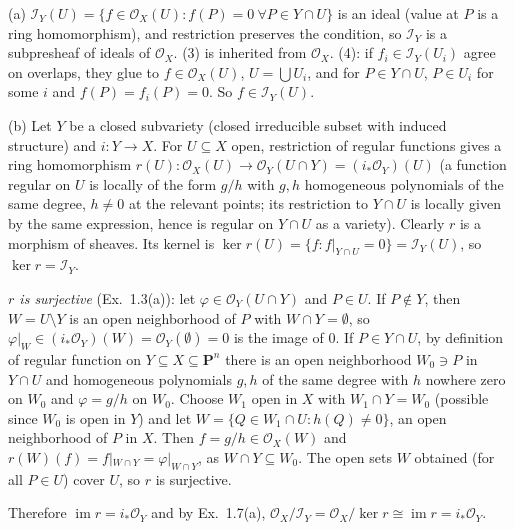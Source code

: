 \documentclass[11pt]{article}
\begin{document}
(a) $\mathcal I_Y(U)=\{f\in\mathcal O_X(U):f(P)=0\ \forall P\in Y\cap U\}$ is an ideal (value at $P$ is a ring homomorphism), and restriction preserves the condition, so $\mathcal I_Y$ is a subpresheaf of ideals of $\mathcal O_X$. (3) is inherited from $\mathcal O_X$. (4): if $f_i\in\mathcal I_Y(U_i)$ agree on overlaps, they glue to $f\in\mathcal O_X(U)$, $U=\bigcup U_i$, and for $P\in Y\cap U$, $P\in U_i$ for some $i$ and $f(P)=f_i(P)=0$. So $f\in\mathcal I_Y(U)$.

(b) Let $Y$ be a closed subvariety (closed irreducible subset with induced structure) and $i\colon Y\to X$. For $U\subseteq X$ open, restriction of regular functions gives a ring homomorphism $r(U)\colon\mathcal O_X(U)\to\mathcal O_Y(U\cap Y)=(i_*\mathcal O_Y)(U)$ (a function regular on $U$ is locally of the form $g/h$ with $g,h$ homogeneous polynomials of the same degree, $h\ne0$ at the relevant points; its restriction to $Y\cap U$ is locally given by the same expression, hence is regular on $Y\cap U$ as a variety). Clearly $r$ is a morphism of sheaves. Its kernel is $\ker r(U)=\{f:f|_{Y\cap U}=0\}=\mathcal I_Y(U)$, so $\ker r=\mathcal I_Y$.

\emph{$r$ is surjective} (Ex.~1.3(a)): let $\varphi\in\mathcal O_Y(U\cap Y)$ and $P\in U$. If $P\notin Y$, then $W=U\setminus Y$ is an open neighborhood of $P$ with $W\cap Y=\emptyset$, so $\varphi|_W\in(i_*\mathcal O_Y)(W)=\mathcal O_Y(\emptyset)=0$ is the image of $0$. If $P\in Y\cap U$, by definition of regular function on $Y\subseteq X\subseteq\mathbf P^n$ there is an open neighborhood $W_0\ni P$ in $Y\cap U$ and homogeneous polynomials $g,h$ of the same degree with $h$ nowhere zero on $W_0$ and $\varphi=g/h$ on $W_0$. Choose $W_1$ open in $X$ with $W_1\cap Y=W_0$ (possible since $W_0$ is open in $Y$) and let $W=\{Q\in W_1\cap U:h(Q)\ne0\}$, an open neighborhood of $P$ in $X$. Then $f=g/h\in\mathcal O_X(W)$ and $r(W)(f)=f|_{W\cap Y}=\varphi|_{W\cap Y}$, as $W\cap Y\subseteq W_0$. The open sets $W$ obtained (for all $P\in U$) cover $U$, so $r$ is surjective.

Therefore $\operatorname{im}r=i_*\mathcal O_Y$ and by Ex.~1.7(a), $\mathcal O_X/\mathcal I_Y=\mathcal O_X/\ker r\cong\operatorname{im}r=i_*\mathcal O_Y$.
\end{document}
